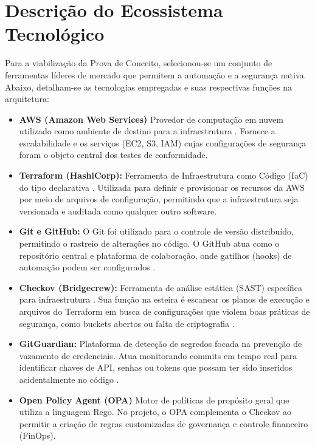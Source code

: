 \section{Descrição do Ecossistema Tecnológico}
Para a viabilização da Prova de Conceito, selecionou-se um conjunto de ferramentas líderes de mercado que permitem a automação e a segurança nativa. Abaixo, detalham-se as tecnologias empregadas e suas respectivas funções na arquitetura:
\begin{itemize}
    \item\textbf{AWS (Amazon Web Services)} Provedor de computação em nuvem utilizado como ambiente de destino para a infraestrutura . Fornece a escalabilidade e os serviços (EC2, S3, IAM) cujas configurações de segurança foram o objeto central dos testes de conformidade.
    \item\textbf{Terraform (HashiCorp):} Ferramenta de Infraestrutura como Código (IaC) do tipo declarativa . Utilizada para definir e provisionar os recursos da AWS por meio de arquivos de configuração, permitindo que a infraestrutura seja versionada e auditada como qualquer outro software.
    \item\textbf{Git e GitHub:} O Git foi utilizado para o controle de versão distribuído, permitindo o rastreio de alterações no código. O GitHub atua como o repositório central e plataforma de colaboração, onde gatilhos (hooks) de automação podem ser configurados .
    \item\textbf{Checkov (Bridgecrew):} Ferramenta de análise estática (SAST) específica para infraestrutura . Sua função na esteira é escanear os planos de execução e arquivos do Terraform em busca de configurações que violem boas práticas de segurança, como buckets abertos ou falta de criptografia .
    \item\textbf{GitGuardian:} Plataforma de detecção de segredos focada na prevenção de vazamento de credenciais. Atua monitorando commits em tempo real para identificar chaves de API, senhas ou tokens que possam ter sido inseridos acidentalmente no código .
    \item\textbf{Open Policy Agent (OPA)} Motor de políticas de propósito geral que utiliza a linguagem Rego. No projeto, o OPA complementa o Checkov ao permitir a criação de regras customizadas de governança e controle financeiro (FinOps).
    
\end{itemize}

